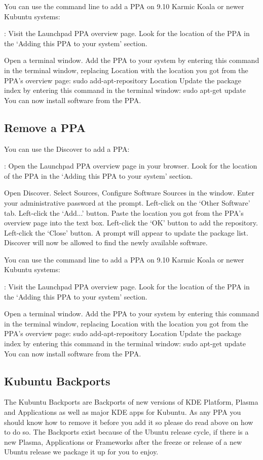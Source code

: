 \documentclass[letterpaper,10pt,english]{sphinxmanual}
\begin{document}
You can use the command line to add a PPA on 9.10 Karmic Koala or newer Kubuntu systems:

: Visit the Launchpad PPA overview page. Look for the location of the PPA in the `Adding this PPA to your system' section.

Open a terminal window. Add the PPA to your system by entering this command in the terminal window, replacing Location with the location you got from the PPA's overview page: sudo add-apt-repository Location Update the package index by entering this command in the terminal window: sudo apt-get update You can now install software from the PPA.


\subsection{Remove a PPA}
\label{\detokenize{docs/repositories:remove-a-ppa}}
You can use the Discover to add a PPA:

: Open the Launchpad PPA overview page in your browser. Look for the location of the PPA in the `Adding this PPA to your system' section.

Open Discover. Select Sources, Configure Software Sources in the window. Enter your administrative password at the prompt. Left-click on the `Other Software' tab. Left-click the `Add...' button. Paste the location you got from the PPA's overview page into the text box. Left-click the `OK' button to add the repository. Left-click the `Close' button. A prompt will appear to update the package list. Discover will now be allowed to find the newly available software.

You can use the command line to add a PPA on 9.10 Karmic Koala or newer Kubuntu systems:

: Visit the Launchpad PPA overview page. Look for the location of the PPA in the `Adding this PPA to your system' section.

Open a terminal window. Add the PPA to your system by entering this command in the terminal window, replacing Location with the location you got from the PPA's overview page: sudo add-apt-repository Location Update the package index by entering this command in the terminal window: sudo apt-get update You can now install software from the PPA.


\subsection{Kubuntu Backports}
\label{\detokenize{docs/repositories:kubuntu-backports}}
The Kubuntu Backports are \sphinxquotedblleft{}Backports of new versions of KDE Platform, Plasma and Applications as well as major KDE apps for Kubuntu.\sphinxquotedblright{} As any PPA you should know how to remove it before you add it so please do read above on how to do so. The Backports exist because of the Ubuntu release cycle, if there is a new Plasma, Applications or Frameworks after the freeze or release of a new Ubuntu release we package it up for you to enjoy.
\end{document}
